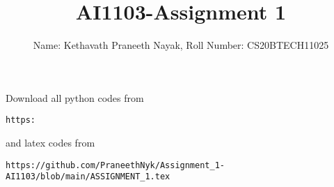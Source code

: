 \documentclass[journal,12pt,twocolumn]{IEEEtran}
\DeclareMathOperator*{\Res}{Res}
\begin{document}
\newcommand{\BEQA}{\begin{eqnarray}}
\newcommand{\EEQA}{\end{eqnarray}}
\newcommand{\define}{\stackrel{\triangle}{=}}

\raggedbottom
\setlength{\parindent}{0pt}
\providecommand{\mbf}{\mathbf}
\providecommand{\pr}[1]{\ensuremath{\Pr\left(#1\right)}}
\providecommand{\qfunc}[1]{\ensuremath{Q\left(#1\right)}}
\providecommand{\sbrak}[1]{\ensuremath{{}\left[#1\right]}}
\providecommand{\lsbrak}[1]{\ensuremath{{}\left[#1\right.}}
\providecommand{\rsbrak}[1]{\ensuremath{{}\left.#1\right]}}
\providecommand{\brak}[1]{\ensuremath{\left(#1\right)}}
\providecommand{\lbrak}[1]{\ensuremath{\left(#1\right.}}
\providecommand{\rbrak}[1]{\ensuremath{\left.#1\right)}}
\providecommand{\cbrak}[1]{\ensuremath{\left\{#1\right\}}}
\providecommand{\lcbrak}[1]{\ensuremath{\left\{#1\right.}}
\providecommand{\rcbrak}[1]{\ensuremath{\left.#1\right\}}}
\theoremstyle{remark}
\newtheorem{rem}{Remark}
\newcommand{\sgn}{\mathop{\mathrm{sgn}}}
\providecommand{\abs}[1]{\vert#1\vert}
\providecommand{\res}[1]{\Res\displaylimits_{#1}} 
\providecommand{\norm}[1]{\lVert#1\rVert}
\providecommand{\mtx}[1]{\mathbf{#1}}
\providecommand{\mean}[1]{E[ #1 ]}
\providecommand{\fourier}{\overset{\mathcal{F}}{ \rightleftharpoons}}
\providecommand{\system}{\overset{\mathcal{H}}{ \longleftrightarrow}}
\newcommand{\solution}{\noindent \textbf{Solution: }}
\newcommand{\cosec}{\,\text{cosec}\,}
\providecommand{\dec}[2]{\ensuremath{\overset{#1}{\underset{#2}{\gtrless}}}}
\newcommand{\myvec}[1]{\ensuremath{\begin{pmatrix}#1\end{pmatrix}}}
\newcommand{\mydet}[1]{\ensuremath{\begin{vmatrix}#1\end{vmatrix}}}
\makeatletter
{}
\makeatother
\let\StandardTheFigure\thefigure
\let\vec\mathbf
\renewcommand{\thefigure}{\theproblem}
\def\putbox#1#2#3{\makebox[0in][l]{\makebox[#1][l]{}\raisebox{\baselineskip}[0in][0in]{\raisebox{#2}[0in][0in]{#3}}}}
     \def\rightbox#1{\makebox[0in][r]{#1}}
     \def\centbox#1{\makebox[0in]{#1}}
     \def\topbox#1{\raisebox{-\baselineskip}[0in][0in]{#1}}
     \def\midbox#1{\raisebox{-0.5\baselineskip}[0in][0in]{#1}}
\vspace{3cm}
\title{AI1103-Assignment 1}
\author{Name: Kethavath Praneeth Nayak, Roll Number: CS20BTECH11025}
\maketitle
\newpage
\bigskip
\renewcommand{\thefigure}{\theenumi}
\renewcommand{\thetable}{\theenumi}
Download all python codes from 
\begin{lstlisting}
https:
\end{lstlisting}
%
and latex codes from 
%
\begin{lstlisting}
https://github.com/PraneethNyk/Assignment_1-AI1103/blob/main/ASSIGNMENT_1.tex
\end{lstlisting}
\end{document}
